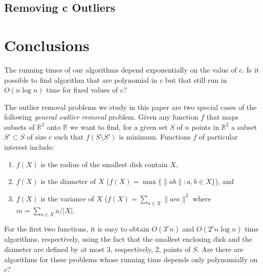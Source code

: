 \documentclass[lotsofwhite]{patmorin}
\begin{document}
\subsection{Removing $\mathbf{c}$ Outliers}

\section{Conclusions}

The running times of our algorithms depend exponentially on the value
of $c$.  Is it possible to find algorithm that are polynomial in $c$
but that still run in $O(n\log n)$ time for fixed values of $c$?

The outlier removal problems we study in this paper are two special
cases of the following \emph{general outlier removal} problem.  Given
any function $f$ that maps subsets of $\mathbb{R}^2$ onto $\mathbb{R}$
we want to find, for a given set $S$ of $n$ points in $\mathbb{R}^2$ a
subset $S'\subset S$ of size $c$ such that $f(S\setminus S')$ is
minimum.  Functions $f$ of particular interest include:
\begin{enumerate}
\item $f(X)$ is the radius of the smallest disk contain $X$,
\item $f(X)$ is the diameter of $X$ ($f(X)=\max\{\|ab\|:a,b\in X\}$), and
\item $f(X)$ is the variance of $X$ ($f(X)=\sum_{a\in X} \| am \|^2$
where $m=\sum_{a\in X} a/|X|$.
\end{enumerate}
For the first two functions, it is easy to obtain $O(3^c n)$ and
$O(2^cn\log n)$ time algorithms, respectively, using the fact that the
smallest enclosing disk and the diameter are defined by at most 3,
respectively, 2, points of $S$.  Are there are algorithms for these
problems whose running time depends only polynomially on $c$?
\end{document}
